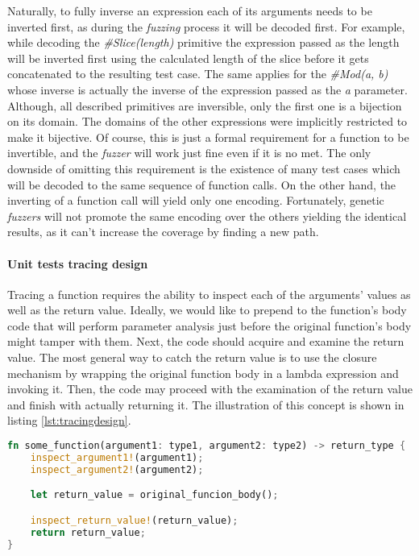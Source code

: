 Naturally, to fully inverse an expression each of its arguments needs to be inverted first, as during the \textit{fuzzing} process it will be decoded first. For example, while decoding the \textit{\#Slice(length)} primitive the expression passed as the length will be inverted first using the calculated length of the slice before it gets concatenated to the resulting test case. The same applies for the \textit{\#Mod(a, b)} whose inverse is actually the inverse of the expression passed as the \textit{a} parameter. Although, all described primitives are inversible, only the first one is a bijection on its domain. The domains of the other expressions were implicitly restricted to make it bijective. Of course, this is just a formal requirement for a function to be invertible, and the \textit{fuzzer} will work just fine even if it is no met. The only downside of omitting this requirement is the existence of many test cases which will be decoded to the same sequence of function calls. On the other hand, the inverting of a function call will yield only one encoding. Fortunately, genetic \textit{fuzzers} will not promote the same encoding over the others yielding the identical results, as it can't increase the coverage by finding a new path. 


\paragraph{Unit tests tracing design}
Tracing a function requires the ability to inspect each of the arguments' values as well as the return value. Ideally, we would like to prepend to the function's body code that will perform parameter analysis just before the original function's body might tamper with them. Next, the code should acquire and examine the return value. The most general way to catch the return value is to use the closure mechanism by wrapping the original function body in a lambda expression and invoking it. Then, the code may proceed with the examination of the return value and finish with actually returning it. The illustration of this concept is shown in listing \ref{lst:tracingdesign}.

\begin{minipage}{\linewidth}
\begin{lstlisting}[language=rust,caption={Unit tests tracing design.},label={lst:tracingdesign}]
fn some_function(argument1: type1, argument2: type2) -> return_type {
    inspect_argument1!(argument1);
    inspect_argument2!(argument2);

    let return_value = original_funcion_body();

    inspect_return_value!(return_value);
    return return_value;
}
\end{lstlisting}
\end{minipage}

